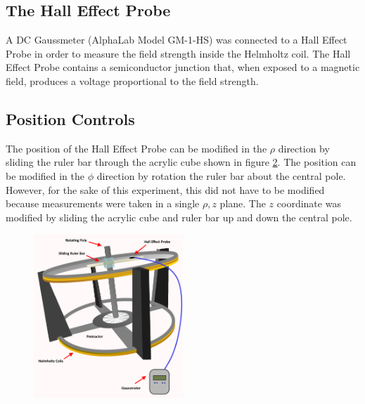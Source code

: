 \documentclass[a4paper]{article}
\begin{document}
\begin{figure}[h]
\centering
\label{helmholtz_circuit}
\end{figure}

\subsection{The Hall Effect Probe}
A DC Gaussmeter (AlphaLab Model GM-1-HS) was connected to a Hall Effect Probe in order to measure the field strength inside the Helmholtz coil. The Hall Effect Probe contains a semiconductor junction that, when exposed to a magnetic field, produces a voltage proportional to the field strength.

\subsection{Position Controls}

The position of the Hall Effect Probe can be modified in the $\rho$ direction by sliding the ruler bar through the acrylic cube shown in figure \ref{helmholtz_diagram}. The position can be modified in the $\phi$ direction by rotation the ruler bar about the central pole. However, for the sake of this experiment, this did not have to be modified because measurements were taken in a single $\rho , z$ plane. The $z$ coordinate was modified by sliding the acrylic cube and ruler bar up and down the central pole.

\begin{figure}[h]
\centering
\includegraphics[width=0.5\textwidth]{helmholtz_diagram.png}
\label{helmholtz_diagram}
\end{figure}
\end{document}
